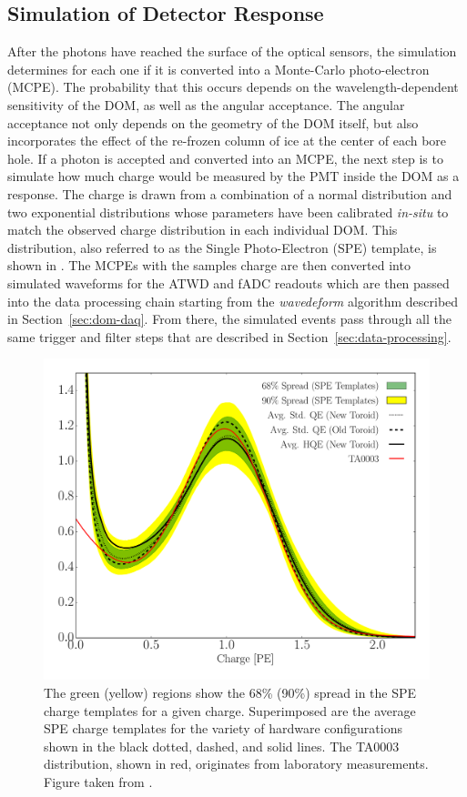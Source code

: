 \subsection{Simulation of Detector Response}
\label{sec:sim-detector-response}
After the photons have reached the surface of the optical sensors, the simulation determines for each one if it is converted into a Monte-Carlo photo-electron (MCPE).
The probability that this occurs depends on the wavelength-dependent sensitivity of the DOM, as well as the angular acceptance.
The angular acceptance not only depends on the geometry of the DOM itself, but also incorporates the effect of the re-frozen column of ice at the center of each bore hole.
If a photon is accepted and converted into an MCPE, the next step is to simulate how much charge would be measured by the PMT inside the DOM as a response.
The charge is drawn from a combination of a normal distribution and two exponential distributions whose parameters have been calibrated \emph{in-situ} to match the observed charge distribution in each individual DOM.
This distribution, also referred to as the Single Photo-Electron (SPE) template, is shown in .
The MCPEs with the samples charge are then converted into simulated waveforms for the ATWD and fADC readouts which are then passed into the data processing chain starting from the \emph{wavedeform} algorithm described in Section~\ref{sec:dom-daq}.
From there, the simulated events pass through all the same trigger and filter steps that are described in Section~\ref{sec:data-processing}.

\begin{figure}
    \centering
    \includegraphics[width=0.8\linewidth]{figures/icecube/detector_response/SPE_TA003_2.pdf}
    \caption{The green (yellow) regions show the 68\% (90\%) spread in the SPE charge templates for a given charge.  Superimposed are the average SPE charge templates for the variety of hardware configurations shown in the black dotted, dashed, and solid lines. The TA0003 distribution, shown in red, originates from laboratory measurements. Figure taken from \cite{ic_spe_20}.}
    \label{fig:spe-templates}
\end{figure}

